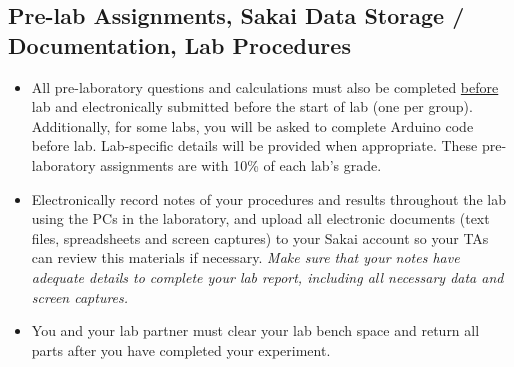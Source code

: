 \subsection{Pre-lab Assignments, Sakai Data Storage / Documentation, Lab Procedures}
\begin{itemize}
    \item All pre-laboratory questions and calculations must also be completed
        \underline{before} lab and electronically submitted before the start
        of lab (one per group). Additionally, for some labs, you will be asked
        to complete Arduino code before lab.  Lab-specific details will be
        provided when appropriate.  These pre-laboratory assignments are with
        10\% of each lab's grade.
    \item Electronically record notes of your procedures and results throughout
        the lab using the PCs in the laboratory, and upload all electronic
        documents (text files, spreadsheets and screen captures) to your Sakai
        account so your TAs can review this materials if necessary.  \emph{Make
            sure that your notes have adequate details to complete your lab
            report, including all necessary data and screen captures.}
    \item You and your lab partner must clear your lab bench space and
        return all parts after you have completed your experiment.  
\end{itemize}

